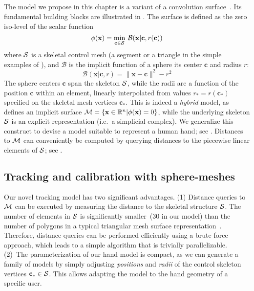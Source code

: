 \subsection*{}
The model we propose in this chapter is a variant of a convolution surface~\cite{bloomenthal1991convolution}. Its fundamental building blocks are illustrated in . The surface is defined as the zero iso-level of the scalar function
% 
\begin{equation}
\phi(\mathbf{x}) = \min_{\mathbf{c} \in \mathcal{S}} \: \mathcal{B}(\mathbf{x} | \mathbf{c}, r(\mathbf{c}))
\label{eq:convsurf}
\end{equation}
% 
where $\mathcal{S}$ is a skeletal control mesh (a segment or a triangle in the simple examples of ), and $\mathcal{B}$ is the implicit function of a sphere  its center $\mathbf{c}$ and radius $r$:
% 
\begin{equation}
\mathcal{B}(\mathbf{x} | \mathbf{c},r ) = \|\mathbf{x}-\mathbf{c}\|^2 - r^2
\end{equation}
% 
The sphere centers $\mathbf{c}$ span the skeleton $\mathcal{S}$, while the radii are a function of the position $\mathbf{c}$ within an element, linearly interpolated from values $r_*=r(\mathbf{c}_*)$ specified on the skeletal mesh vertices $\mathbf{c}_*$. This is indeed a \emph{hybrid} model, as  defines an implicit surface $\mathcal{M} = \{\mathbf{x} \in \mathbb{R}^n | \phi(\mathbf{x})=0 \}$, while the underlying skeleton $\mathcal{S}$ is an explicit representation (i.e.\ a simplicial complex). We generalize this construct to devise a model suitable to represent a human hand; see .
Distances to $\mathcal{M}$ can conveniently be computed by querying distances to the piecewise linear elements of $\mathcal{S}$; see .


\subsection*{Tracking and calibration with sphere-meshes}
Our novel tracking model has two significant advantages. (1) Distance queries to $\mathcal{M}$ can be executed by measuring the distance to the skeletal structure $\mathcal{S}$. The number of elements in $\mathcal{S}$ is significantly smaller~(30 in our model) than the number of polygons in a typical triangular mesh surface representation~\cite{thiery2013sphere}. 
Therefore, distance queries can be performed efficiently using a brute force approach, which leads to a simple algorithm that is trivially parallelizable.
(2)~The parameterization of our hand model is compact, as we can generate a family of models by simply adjusting \emph{positions} and \emph{radii} of the control skeleton vertices $\mathbf{c}_* \in \mathcal{S}$. This allows adapting the model to the hand geometry of a specific user.

